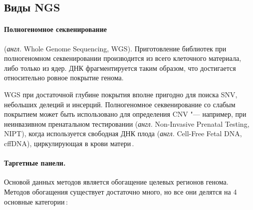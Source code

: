 \documentclass[a4paper,14pt]{extarticle}
\newcommand{\anglia}[1]{\textit{англ.} \textenglish{#1}}
\begin{document}
\subsection{Виды NGS}

\paragraph{Полногеномное секвенирование} (\anglia{Whole Genome Sequencing, WGS}).
Приготовление библиотек при полногеномном секвенировании производится из всего клеточного материала, либо только из ядер.
ДНК фрагментируется таким образом, что достигается относительно ровное покрытие генома.

WGS при достаточной глубине покрытия вполне пригодно для поиска SNV, небольших делеций и инсерций.
Полногеномное секвенирование со слабым покрытием может быть использовано для определения CNV "--- например, при неинвазивном пренатальном тестировании (\anglia{Non-Invasive Prenatal Testing, NIPT}), когда используется свободная ДНК плода (\anglia{Cell-Free Fetal DNA, cffDNA}), циркулирующая в крови матери\,\cite{Yu_2019}.

\paragraph{Таргетные панели.}
Основой данных методов является обогащение целевых регионов генома.
Методов обогащения существует достаточно много, но все они делятся на 4 основные категории\,\cite{Teer_2010}:
\end{document}
